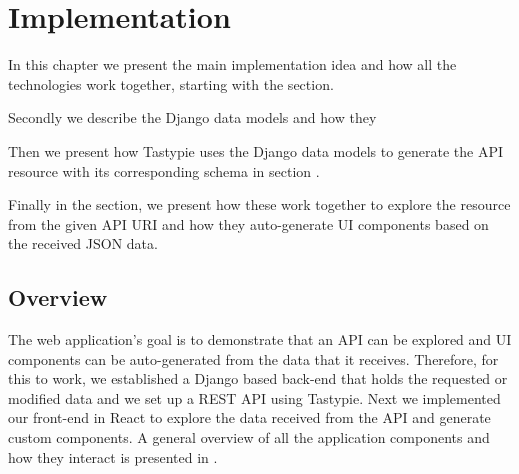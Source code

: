 \chapter{Implementation}
\label{chapter:implementation}

In this chapter we present the main implementation idea and how all the technologies work together, starting with the  section.

Secondly we describe the Django data models and how they 

Then we present how Tastypie uses the Django data models to generate the API resource with its corresponding schema in section .

Finally in the  section, we present how these work together to explore the resource from the given API URI and how they auto-generate UI components based on the received JSON data.

\section{Overview}
\label{sec:overview}

The web application's goal is to demonstrate that an API can be explored and UI components can be auto-generated from the data that it receives. Therefore, for this to work, we established a Django based back-end that holds the requested or modified data and we set up a REST API using Tastypie. Next we implemented our front-end in React to explore the data received from the API and generate custom components. A general overview of all the application components and how they interact is presented in . %


